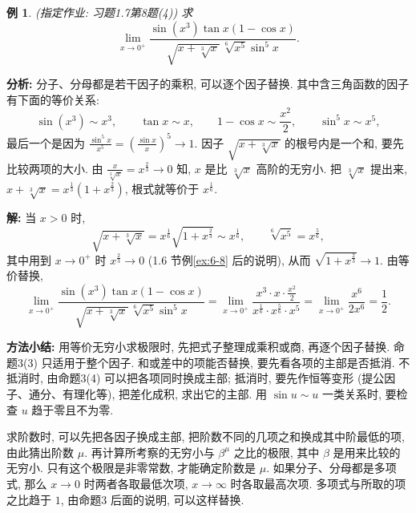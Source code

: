\documentclass[UTF8,openany]{ctexbook}
\theoremstyle{chinesetextbook}
\newtheorem{example}{例}[section]
\newenvironment{cnsolution}{\par\indent\textbf{解:} \ignorespaces}{\par}
\begin{document}
\begin{example}
\textnormal{(指定作业: 习题1.7第8题(4))} 求
\[
\lim_{x\to0^+}\frac{\sin(x^3)\tan x(1-\cos x)}{\sqrt{x+\sqrt[3]x}\,\sqrt[6]{x^5}\sin^5x}.
\]
\end{example}
\par\indent\textbf{分析:} 分子、分母都是若干因子的乘积, 可以逐个因子替换. 其中含三角函数的因子有下面的等价关系:
\[
\sin(x^3)\sim x^3,\qquad\tan x\sim x,\qquad1-\cos x\sim\frac{x^2}2,\qquad\sin^5x\sim x^5,
\]
最后一个是因为 $\displaystyle\frac{\sin^5x}{x^5}=\left(\frac{\sin x}x\right)^5\to1$. 因子 $\sqrt{x+\sqrt[3]x}$ 的根号内是一个和, 要先比较两项的大小. 由 $\displaystyle\frac x{\sqrt[3]x}=x^{\frac23}\to0$ 知, $x$ 是比 $\sqrt[3]x$ 高阶的无穷小. 把 $\sqrt[3]x$ 提出来, $x+\sqrt[3]x=x^{\frac13}\left(1+x^{\frac23}\right)$, 根式就等价于 $x^{\frac16}$.
\begin{cnsolution}
当 $x>0$ 时,
\[
\sqrt{x+\sqrt[3]x}=x^{\frac16}\sqrt{1+x^{\frac23}}\sim x^{\frac16},\qquad\sqrt[6]{x^5}=x^{\frac56},
\]
其中用到 $x\to0^+$ 时 $x^{\frac23}\to0$ (1.6 节例\ref{ex:6-8} 后的说明), 从而 $\sqrt{1+x^{\frac23}}\to1$. 由等价替换,
\[
\lim_{x\to0^+}\frac{\sin(x^3)\tan x(1-\cos x)}{\sqrt{x+\sqrt[3]x}\,\sqrt[6]{x^5}\sin^5x}=\lim_{x\to0^+}\frac{x^3\cdot x\cdot\frac{x^2}2}{x^{\frac16}\cdot x^{\frac56}\cdot x^5}=\lim_{x\to0^+}\frac{x^6}{2x^6}=\frac12.
\]
\end{cnsolution}
\par\indent\textbf{方法小结:} 用等价无穷小求极限时, 先把式子整理成乘积或商, 再逐个因子替换. 命题3(3) 只适用于整个因子. 和或差中的项能否替换, 要先看各项的主部是否抵消. 不抵消时, 由命题3(4) 可以把各项同时换成主部; 抵消时, 要先作恒等变形 (提公因子、通分、有理化等), 把差化成积, 求出它的主部. 用 $\sin u\sim u$ 一类关系时, 要检查 $u$ 趋于零且不为零.

求阶数时, 可以先把各因子换成主部, 把阶数不同的几项之和换成其中阶最低的项, 由此猜出阶数 $\mu$. 再计算所考察的无穷小与 $\beta^\mu$ 之比的极限, 其中 $\beta$ 是用来比较的无穷小. 只有这个极限是非零常数, 才能确定阶数是 $\mu$. 如果分子、分母都是多项式, 那么 $x\to0$ 时两者各取最低次项, $x\to\infty$ 时各取最高次项. 多项式与所取的项之比趋于 $1$, 由命题3 后面的说明, 可以这样替换.
\end{document}
